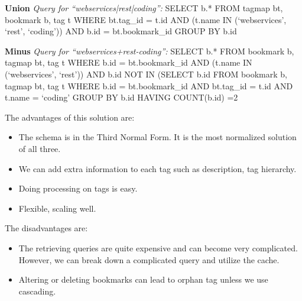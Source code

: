\textbf{Union}\newline
\textit{Query for ``webservices|rest|coding'':}\newline\newline
SELECT b.*\newline
FROM tagmap bt, bookmark b, tag t\newline
WHERE bt.tag\_id = t.id\newline
AND (t.name IN (`webservices', `rest', `coding'))\newline
AND b.id = bt.bookmark\_id\newline
GROUP BY b.id

\textbf{Minus}\newline
\textit{Query for ``webservices+rest-coding'':}\newline\newline
SELECT b.*\newline
FROM bookmark b, tagmap bt, tag t\newline
WHERE b.id = bt.bookmark\_id\newline
AND (t.name IN (`webservices', `rest'))\newline
AND b.id NOT IN (SELECT b.id FROM bookmark b, tagmap bt, tag t\newline
WHERE b.id = bt.bookmark\_id AND bt.tag\_id = t.id AND t.name = `coding'\newline
GROUP BY b.id\newline
HAVING COUNT(b.id) =2

The advantages of this solution are:
\begin{itemize}
   \item The schema is in the Third Normal Form. It is the most normalized solution of all three.
   \item We can add extra information to each tag such as description, tag hierarchy. 
   \item Doing processing on tags is easy.
   \item Flexible, scaling well.
\end{itemize}

The disadvantages are:
\begin{itemize}
   \item The retrieving queries are quite expensive and can become very complicated. However, we can break down a complicated query and utilize the cache.
   \item Altering or deleting bookmarks can lead to orphan tag unless we use cascading.
\end{itemize}

